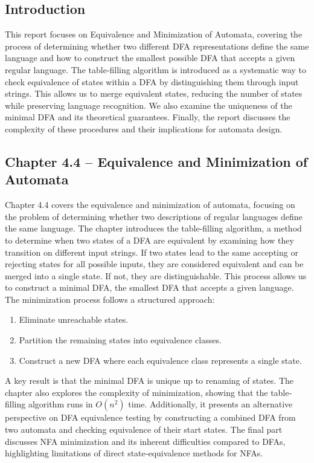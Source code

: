 \documentclass{article}
\theoremstyle{theorem}
\theoremstyle{definition}
\theoremstyle{remark}
\begin{document}
\subsection{Introduction}
This report focuses on Equivalence and Minimization of Automata, covering the process of determining whether two different DFA representations define the same language and how to construct the smallest possible DFA that accepts a given regular language. The table‐filling algorithm is introduced as a systematic way to check equivalence of states within a DFA by distinguishing them through input strings. This allows us to merge equivalent states, reducing the number of states while preserving language recognition. We also examine the uniqueness of the minimal DFA and its theoretical guarantees. Finally, the report discusses the complexity of these procedures and their implications for automata design.

\subsection{Chapter 4.4 – Equivalence and Minimization of Automata}
Chapter 4.4 covers the equivalence and minimization of automata, focusing on the problem of determining whether two descriptions of regular languages define the same language. The chapter introduces the table‐filling algorithm, a method to determine when two states of a DFA are equivalent by examining how they transition on different input strings. If two states lead to the same accepting or rejecting states for all possible inputs, they are considered equivalent and can be merged into a single state. If not, they are distinguishable. This process allows us to construct a minimal DFA, the smallest DFA that accepts a given language. The minimization process follows a structured approach:
\begin{enumerate}
  \item Eliminate unreachable states.
  \item Partition the remaining states into equivalence classes.
  \item Construct a new DFA where each equivalence class represents a single state.
\end{enumerate}
A key result is that the minimal DFA is unique up to renaming of states. The chapter also explores the complexity of minimization, showing that the table‐filling algorithm runs in \(O(n^2)\) time. Additionally, it presents an alternative perspective on DFA equivalence testing by constructing a combined DFA from two automata and checking equivalence of their start states. The final part discusses NFA minimization and its inherent difficulties compared to DFAs, highlighting limitations of direct state‐equivalence methods for NFAs.
\end{document}
